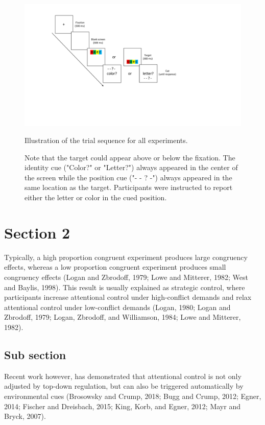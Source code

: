 \documentclass[]{DissertateCUNY}
\begin{document}
\begin{figure}
  \centering
  \includegraphics[width=5in]{figures/figure1.pdf}
  \caption{Illustration of the trial sequence for all experiments.}
  \caption*{Note that the target could appear above or below the fixation. The identity cue ("Color?" or "Letter?") always appeared in the center of the screen while the position cue ("- - ? -") always appeared in the same location as the target. Participants were instructed to report either the letter or color in the cued position.}

  \label{figure1}
\end{figure}

\hypertarget{section-2}{%
\section{Section 2}\label{section-2}}

Typically, a high proportion congruent experiment produces large
congruency effects, whereas a low proportion congruent experiment
produces small congruency effects (Logan and Zbrodoff, 1979; Lowe and
Mitterer, 1982; West and Baylis, 1998). This result is usually explained
as strategic control, where participants increase attentional control
under high-conflict demands and relax attentional control under
low-conflict demands (Logan, 1980; Logan and Zbrodoff, 1979; Logan,
Zbrodoff, and Williamson, 1984; Lowe and Mitterer, 1982).

\hypertarget{sub-section}{%
\subsection{Sub section}\label{sub-section}}

Recent work however, has demonstrated that attentional control is not
only adjusted by top-down regulation, but can also be triggered
automatically by environmental cues (Brosowsky and Crump, 2018; Bugg and
Crump, 2012; Egner, 2014; Fischer and Dreisbach, 2015; King, Korb, and
Egner, 2012; Mayr and Bryck, 2007).
\end{document}

